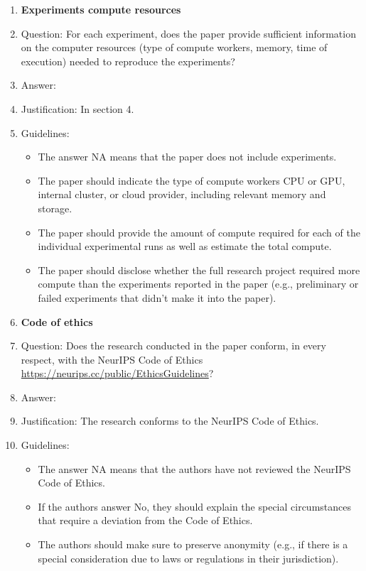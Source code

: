 \documentclass{article}
\begin{document}
\begin{enumerate}
\item {\bf Experiments compute resources}
    \item[] Question: For each experiment, does the paper provide sufficient information on the computer resources (type of compute workers, memory, time of execution) needed to reproduce the experiments?
    \item[] Answer: \answerYes{} %
    \item[] Justification: In section 4.
    \item[] Guidelines:
    \begin{itemize}
        \item The answer NA means that the paper does not include experiments.
        \item The paper should indicate the type of compute workers CPU or GPU, internal cluster, or cloud provider, including relevant memory and storage.
        \item The paper should provide the amount of compute required for each of the individual experimental runs as well as estimate the total compute. 
        \item The paper should disclose whether the full research project required more compute than the experiments reported in the paper (e.g., preliminary or failed experiments that didn't make it into the paper). 
    \end{itemize}
    
\item {\bf Code of ethics}
    \item[] Question: Does the research conducted in the paper conform, in every respect, with the NeurIPS Code of Ethics \url{https://neurips.cc/public/EthicsGuidelines}?
    \item[] Answer: \answerYes{} %
    \item[] Justification: The research conforms to the NeurIPS Code of Ethics.
    \item[] Guidelines:
    \begin{itemize}
        \item The answer NA means that the authors have not reviewed the NeurIPS Code of Ethics.
        \item If the authors answer No, they should explain the special circumstances that require a deviation from the Code of Ethics.
        \item The authors should make sure to preserve anonymity (e.g., if there is a special consideration due to laws or regulations in their jurisdiction).
    \end{itemize}



\end{enumerate}
\end{document}
